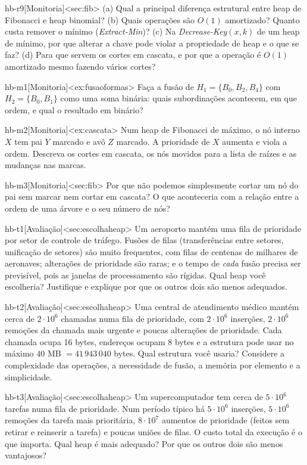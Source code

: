 \begin{exercicio}{hb-r9}[Monitoria]<sec:fib>
(a) Qual a principal diferença estrutural entre heap de Fibonacci e heap binomial? (b) Quais operações são $O(1)$ amortizado? Quanto custa remover o mínimo (\emph{Extract-Min})? (c) Na \emph{Decrease-Key}$(x,k)$ de um heap de mínimo, por que alterar a chave pode violar a propriedade de heap e o que se faz? (d) Para que servem os cortes em cascata, e por que a operação é $O(1)$ amortizado mesmo fazendo vários cortes?
\end{exercicio}
\begin{exercicio}{hb-m1}[Monitoria]<ex:fusaoformas>
Faça a fusão de $H_1=\{B_0,B_2,B_4\}$ com $H_2=\{B_0,B_1\}$ como uma soma binária: quais subordinações acontecem, em que ordem, e qual o resultado em binário?
\end{exercicio}
\begin{exercicio}{hb-m2}[Monitoria]<ex:cascata>
Num heap de Fibonacci de máximo, o nó interno $X$ tem pai $Y$ marcado e avô $Z$ marcado. A prioridade de $X$ aumenta e viola a ordem. Descreva os cortes em cascata, os nós movidos para a lista de raízes e as mudanças nas marcas.
\end{exercicio}
\begin{exercicio}{hb-m3}[Monitoria]<sec:fib>
Por que não podemos simplesmente cortar um nó do pai sem marcar nem cortar em cascata? O que aconteceria com a relação entre a ordem de uma árvore e o seu número de nós?
\end{exercicio}
\begin{exercicio}{hb-t1}[Avaliação]<sec:escolhaheap>
Um aeroporto mantém uma fila de prioridade por setor de controle de tráfego. Fusões de filas (transferências entre setores, unificação de setores) são muito frequentes, com filas de centenas de milhares de aeronaves; alterações de prioridade são raras; e o tempo de \emph{cada} fusão precisa ser previsível, pois as janelas de processamento são rígidas. Qual heap você escolheria? Justifique e explique por que os outros dois são menos adequados.
\end{exercicio}
\begin{exercicio}{hb-t2}[Avaliação]<sec:escolhaheap>
Uma central de atendimento médico mantém cerca de $2\cdot10^6$ chamadas numa fila de prioridade, com $2\cdot10^6$ inserções, $2\cdot10^6$ remoções da chamada mais urgente e poucas alterações de prioridade. Cada chamada ocupa 16 bytes, endereços ocupam 8 bytes e a estrutura pode usar no máximo $40$ MB $=41\,943\,040$ bytes. Qual estrutura você usaria? Considere a complexidade das operações, a necessidade de fusão, a memória por elemento e a simplicidade.
\end{exercicio}
\begin{exercicio}{hb-t3}[Avaliação]<sec:escolhaheap>
Um supercomputador tem cerca de $5\cdot10^6$ tarefas numa fila de prioridade. Num período típico há $5\cdot10^6$ inserções, $5\cdot10^6$ remoções da tarefa mais prioritária, $8\cdot10^7$ aumentos de prioridade (feitos sem retirar e reinserir a tarefa) e poucas uniões de filas. O custo total da execução é o que importa. Qual heap é mais adequado? Por que os outros dois são menos vantajosos?
\end{exercicio}

